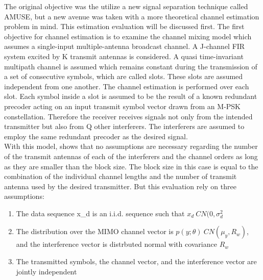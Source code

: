 The original objective was the utilize a new signal separation technique called AMUSE, but a new avenue was taken with a more theoretical channel estimation problem in mind.  This estimation evaluation will be discussed first.  The first objective for channel estimation is to examine the channel mixing model which assumes a single-input multiple-antenna broadcast channel.  A J-channel FIR system excited by K transmit antennas is considered. A quasi time-invariant multipath channel is assumed which remains constant during the transmission of a set of consecutive symbols, which are called slots. These slots are assumed independent from one another.  The channel estimation is performed over each slot. Each symbol inside a slot is assumed to be the result of a known redundant precoder acting on an input transmit symbol vector drawn from an M-PSK constellation. Therefore the receiver receives signals not only from the intended transmitter but also from Q other interferers. The interferers are assumed to employ the same redundant precoder as the desired signal\cite{skrkantPHD}.\\

With this model, \cite{midterm_report} shows that no assumptions are necessary regarding the number of the transmit antennas of each of the interferers and the channel orders as long as they are smaller than the block size.  The block size in this case is equal to the combination of the individual channel lengths and the number of transmit antenna used by the desired transmitter.  But this evaluation rely on three assumptions:\\

\begin{enumerate}
\item The data sequence x_{d} is an i.i.d. sequence such that \(x_{d}~CN(0,\sigma_{d}^{2}\)

\item The distribution over the MIMO channel vector is \(p(y;\theta)~CN(\mu_{y},R_{w})\), and the interference vector is distrbuted normal with covariance \(R_{w}\)

\item The transmitted symbols, the channel vector, and the interference vector are jointly independent
\end{enumerate}


